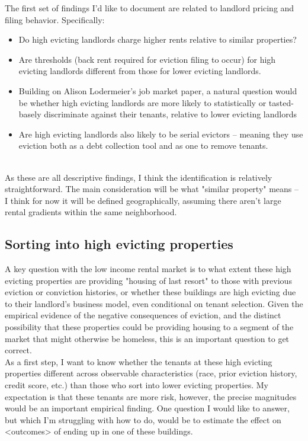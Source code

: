 \documentclass{article}
\begin{document}
The first set of findings I'd like to document are related to landlord pricing and filing behavior. Specifically:

\begin{itemize}
    \item Do high evicting landlords charge higher rents relative to similar properties?
    \item Are thresholds (back rent required for eviction filing to occur) for high evicting landlords different from those for lower evicting landlords. 
    \item Building on Alison Lodermeier's job market paper, a natural question would be whether high evicting landlords are more likely to statistically or tasted-basely discriminate against their tenants, relative to lower evicting landlords 
    \item Are high evicting landlords also likely to be serial evictors -- meaning they use eviction both as a debt collection tool and as one to remove tenants.
\end{itemize} \\

As these are all descriptive findings, I think the identification is relatively straightforward. The main consideration will be what "similar property" means -- I think for now it will be defined geographically, assuming there aren't large rental gradients within the same neighborhood.


\subsection{Sorting into high evicting properties}
A key question with the low income rental market is to what extent these high evicting properties are providing "housing of last resort" to those with previous eviction or conviction histories, or whether these buildings are high evicting due to their landlord's business model, even conditional on tenant selection. Given the empirical evidence of the negative consequences of eviction, and the distinct possibility that these properties could be providing housing to a segment of the market that might otherwise be homeless, this is an important question to get correct. \\

As a first step, I want to know whether the tenants at these high evicting properties different across observable characteristics (race, prior eviction history, credit score, etc.) than those who sort into lower evicting properties. My expectation is that these tenants are more risk, however, the precise magnitudes would be an important empirical finding. One question I would like to answer, but which I'm struggling with how to do, would be to estimate the effect on <outcomes> of ending up in one of these buildings. \\
\end{document}
